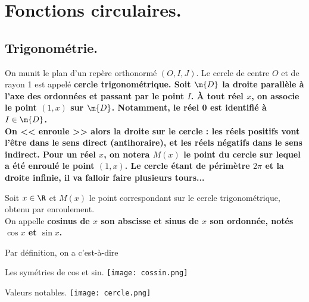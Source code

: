 \documentclass[11pt]{article}
\begin{document}
\pagebreak

\section{Fonctions circulaires.}

\subsection{Trigonométrie.}

\hspace*{0.4cm} On munit le plan d'un repère orthonormé $(O,I,J)$. Le cercle de centre $O$ et de rayon 1 est appelé \bf{cercle trigonométrique}. Soit $\m{D}$ la droite parallèle à l'axe des ordonnées et passant par le point $I$. À tout réel $x$, on associe le point $(1,x)$ sur $\m{D}$. Notamment, le réel 0 est identifié à $I\in\m{D}$.\\
On << enroule >> alors la droite sur le cercle : les réels positifs vont l'être dans le sens direct (antihoraire), et les réels négatifs dans le sens indirect. Pour un réel $x$, on notera $M(x)$ le point du cercle sur lequel a été enroulé le point $(1,x)$. Le cercle étant de périmètre $2\pi$ et la droite infinie, il va falloir faire plusieurs tours...

\begin{defi}{}{}
    Soit $x\in\R$ et $M(x)$ le point correspondant sur le cercle trigonométrique, obtenu par enroulement.\\
    On appelle \bf{cosinus} de $x$ son abscisse et \bf{sinus} de $x$ son ordonnée, notés $\cos x$ et $\sin x$.
\end{defi}

\begin{center}
    Par définition, on a  c'est-à-dire 
\end{center}

\begin{prop}{Les symétries de cos et sin.}{}
    \texttt{[image: cossin.png]}
\end{prop}

\begin{prop}{Valeurs notables.}{}
    \texttt{[image: cercle.png]}
\end{prop}
\end{document}
